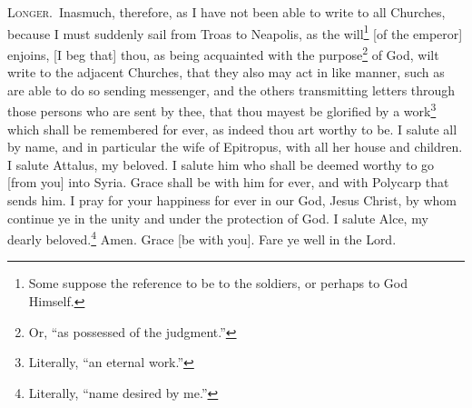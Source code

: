 \textsc{Longer.}~Inasmuch, therefore, as I have not been able to write to all Churches, because I must suddenly sail from Troas to Neapolis, as the will\footnote{Some suppose the reference to be to the soldiers, or perhaps to God Himself.} [of the emperor] enjoins, [I beg that] thou, as being acquainted with the purpose\footnote{Or, “as possessed of the judgment.”} of God, wilt write to the adjacent Churches, that they also may act in like manner, such as are able to do so sending messenger, and the others transmitting letters through those persons who are sent by thee, that thou mayest be glorified by a work\footnote{Literally, “an eternal work.”} which shall be remembered for ever, as indeed thou art worthy to be. I salute all by name, and in particular the wife of Epitropus, with all her house and children. I salute Attalus, my beloved. I salute him who shall be deemed worthy to go [from you] into Syria. Grace shall be with him for ever, and with Polycarp that sends him. I pray for your happiness for ever in our God, Jesus Christ, by whom continue ye in the unity and under the protection of God. I salute Alce, my dearly beloved.\footnote{Literally, “name desired by me.”} Amen. Grace [be with you]. Fare ye well in the Lord.
